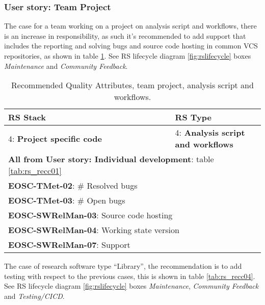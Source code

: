 \subsubsection{User story: Team Project}

The case for a team working on a project on analysis script and workflows, there is an increase in responsibility, as such it's recommended to add support that includes the reporting and solving bugs and source code hosting in common VCS repositories, as shown in table \ref{tab:rs_recc03}. See RS lifecycle diagram \ref{fig:rslifecycle} boxes \textit{Maintenance} and \textit{Community Feedback}.

\begin{center}
\begin{table}
  \label{tab:rs_recc03}
  \small
  \begin{tabular}{|p{0.65\linewidth}|p{0.35\linewidth}|} \hline

    \textbf{RS Stack} & \textbf{RS Type} \\ \hline \hline
    4: \textbf{Project specific code} &
    4: \textbf{Analysis script and workflows} \\ \hline \hline
    \multicolumn{2}{|l|}{\textbf{All from User story: Individual development}: table \ref{tab:rs_recc01}} \\ \hline
    \multicolumn{2}{|l|}{\textbf{EOSC-TMet-02}: \# Resolved bugs} \\ \hline
    \multicolumn{2}{|l|}{\textbf{EOSC-TMet-03}: \# Open bugs} \\ \hline
    \multicolumn{2}{|l|}{\textbf{EOSC-SWRelMan-03}: Source code hosting} \\ \hline
    \multicolumn{2}{|l|}{\textbf{EOSC-SWRelMan-04}: Working state version} \\ \hline
    \multicolumn{2}{|l|}{\textbf{EOSC-SWRelMan-07}: Support} \\ \hline

  \end{tabular}
  \caption{Recommended Quality Attributes, team project, analysis script and workflows.}
\end{table}
\end{center}

The case of research software type ``Library'', the recommendation is to add testing with respect to the previous cases, this is shown in table \ref{tab:rs_recc04}.
See RS lifecycle diagram \ref{fig:rslifecycle} boxes \textit{Maintenance}, \textit{Community Feedback} and \textit{Testing/CICD}.

